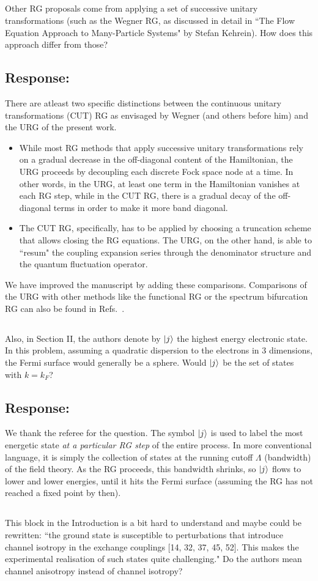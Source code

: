 \documentclass[11pt]{article}
\newcommand{\response}[1]{{\color{blue}\subsection*{Response:}{#1}}}
\newcommand{\point}[1]{\subsection{}{#1}}
\begin{document}
\point{Other RG proposals come from applying a set of successive unitary transformations (such as the Wegner RG, as discussed in detail in ``The Flow Equation Approach to Many-Particle Systems" by Stefan Kehrein). How does this approach differ from those?}

\response{
There are atleast two specific distinctions between the continuous unitary transformations (CUT) RG as envisaged by Wegner (and others before him) and the URG of the present work.
\begin{itemize}
	\item While most RG methods that apply successive unitary transformations rely on a gradual decrease in the off-diagonal content of the Hamiltonian, the URG proceeds by decoupling each discrete Fock space node at a time. In other words, in the URG, at least one term in the Hamiltonian vanishes at each RG step, while in the CUT RG, there is a gradual decay of the off-diagonal terms in order to make it more band diagonal.
	\item The CUT RG, specifically, has to be applied by choosing a truncation scheme that allows closing the RG equations. The URG, on the other hand, is able to ``resum" the coupling expansion series through the denominator structure and the quantum fluctuation operator.  
\end{itemize}
We have improved the manuscript by adding these comparisons. Comparisons of the URG with other methods like the functional RG or the spectrum bifurcation RG can also be found in Refs.~\cite{anirbanmott1,anirbanurg1}.
}

\point{Also, in Section II, the authors denote by $\ket{j}$ the highest energy electronic state. In this problem, assuming a quadratic dispersion to the electrons in 3 dimensions, the Fermi surface would generally be a sphere. Would $\ket{j}$ be the set of states with $k=k_{F}$?}

\response{We thank the referee for the question. The symbol \(\ket{j}\) is used to label the most energetic state {\it at a particular RG step} of the entire process. In more conventional language, it is simply the collection of states at the running cutoff \(\Lambda\) (bandwidth) of the field theory. As the RG proceeds, this bandwidth shrinks, so \(\ket{j}\) flows to lower and lower energies, until it hits the Fermi surface (assuming the RG has not reached a fixed point by then).
}

\point{
This block in the Introduction is a bit hard to understand and maybe could be rewritten: ``the ground state is susceptible to perturbations that introduce channel isotropy in the exchange couplings [14, 32, 37, 45, 52]. This makes the experimental realisation of such states quite challenging." Do the authors mean channel anisotropy instead of channel isotropy?}
\end{document}

